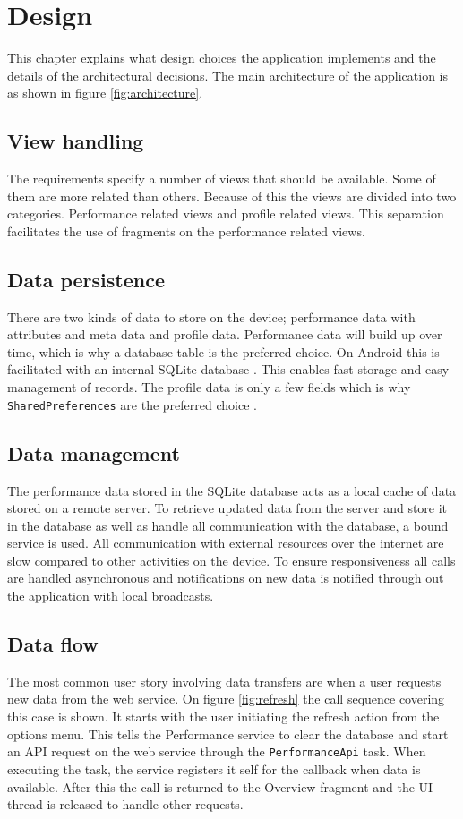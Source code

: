 \chapter{Design}
This chapter explains what design choices the application implements and the details of the architectural decisions. The main architecture of the application is as shown in figure \ref{fig:architecture}. 

\section{View handling}
The requirements specify a number of views that should be available. Some of them are more related than others. Because of this the views are divided into two categories. Performance related views and profile related views. This separation facilitates the use of fragments on the performance related views.

\section{Data persistence}
There are two kinds of data to store on the device; performance data with attributes and meta data and profile data. Performance data will build up over time, which is why a database table is the preferred choice. On Android this is facilitated with an internal SQLite database \citep{android:sqlite}. This enables fast storage and easy management of records. The profile data is only a few fields which is why \verb|SharedPreferences| are the preferred choice \citep{android:sharedprefs}.

\section{Data management}
The performance data stored in the SQLite database acts as a local cache of data stored on a remote server. To retrieve updated data from the server and store it in the database as well as handle all communication with the database, a bound service is used. All communication with external resources over the internet are slow compared to other activities on the device. To ensure responsiveness all calls are handled asynchronous and notifications on new data is notified through out the application with local broadcasts.


\section{Data flow}
The most common user story involving data transfers are when a user requests new data from the web service. On figure \ref{fig:refresh} the call sequence covering this case is shown. It starts with the user initiating the refresh action from the options menu. This tells the Performance service to clear the database and start an API request on the web service through the \verb|PerformanceApi| task. When executing the task, the service registers it self for the callback when data is available. After this the call is returned to the Overview fragment and the UI thread is released to handle other requests.

